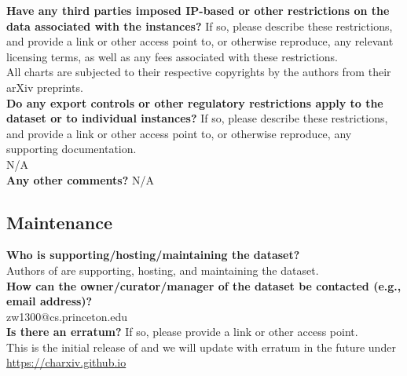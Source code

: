     \textcolor{\sectioncolor}{\textbf{Have any third parties imposed IP-based or other restrictions on the data
    associated with the instances?
    }
    If so, please describe these restrictions, and provide a link or other
    access point to, or otherwise reproduce, any relevant licensing terms, as
    well as any fees associated with these restrictions.
    } \\
    All charts are subjected to their respective copyrights by the authors from their arXiv preprints. \\

    \textcolor{\sectioncolor}{\textbf{Do any export controls or other regulatory restrictions apply to the
    dataset or to individual instances?
    }
    If so, please describe these restrictions, and provide a link or other
    access point to, or otherwise reproduce, any supporting documentation.
    } \\
    N/A \\

    \textcolor{\sectioncolor}{\textbf{Any other comments?
    }} N/A \\

\subsection{Maintenance}

    \textcolor{\sectioncolor}{\textbf{Who is supporting/hosting/maintaining the dataset?
    }
    } \\
    Authors of \ours{} are supporting, hosting, and maintaining the dataset. \\

    \textcolor{\sectioncolor}{\textbf{How can the owner/curator/manager of the dataset be contacted (e.g., email
    address)?
    }
    } \\
    zw1300@cs.princeton.edu \\

    \textcolor{\sectioncolor}{\textbf{Is there an erratum?
    }
    If so, please provide a link or other access point.
    } \\
    This is the initial release of \ours{} and we will update \ours{} with erratum in the future under \url{https://charxiv.github.io} \\

